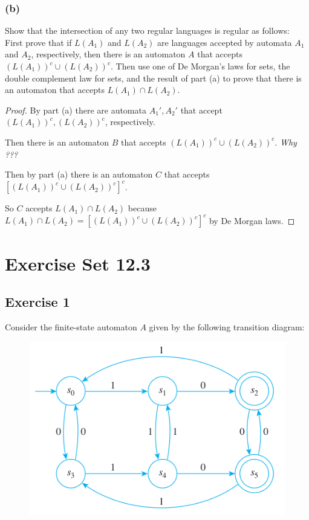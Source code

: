 \documentclass[14pt]{extarticle}
\begin{document}
\subsubsection{(b)}
Show that the intersection of any two regular languages is regular as follows: First prove that if \(L(A_1)\) and
\(L(A_2)\) are languages accepted by automata \(A_1\) and \(A_2\), respectively, then there is an automaton \(A\) that
accepts \((L(A_1))^c \cup (L(A_2))^c\). Then use one of De Morgan’s laws for sets, the double complement law for sets,
and the result of part (a) to prove that there is an automaton that accepts \(L(A_1) \cap L(A_2)\).

\begin{proof}
    By part (a) there are automata \(A_1', A_2'\) that accept \((L(A_1))^c, (L(A_2))^c\), respectively.

    Then there is an automaton \(B\) that accepts \((L(A_1))^c \cup (L(A_2))^c\). {\it Why ???}

    Then by part (a) there is an automaton \(C\) that accepts
    \([(L(A_1))^c \cup (L(A_2))^c]^c\).

    So \(C\) accepts \(L(A_1) \cap L(A_2)\) because \(L(A_1) \cap L(A_2) = [(L(A_1))^c \cup (L(A_2))^c]^c\) by De Morgan laws.
\end{proof}

\section{Exercise Set 12.3}
\subsection{Exercise 1}
Consider the finite-state automaton \(A\) given by the following transition diagram:

\begin{figure}[ht!]
    \centering
    \includegraphics[scale=0.5]{../images/12.3.1.png}
\end{figure}
\end{document}
